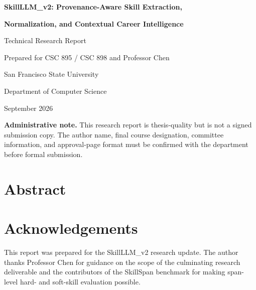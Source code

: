 \documentclass[12pt,letterpaper]{report}
\begin{document}
\begin{titlepage}
  \centering
  \vspace*{1.1in}
  {\Large\bfseries SkillLLM\_v2: Provenance-Aware Skill Extraction,\par}
  \vspace{0.12in}
  {\Large\bfseries Normalization, and Contextual Career Intelligence\par}
  \vspace{0.65in}
  {\large Technical Research Report\par}
  \vspace{0.24in}
  {\large Prepared for CSC 895 / CSC 898 and Professor Chen\par}
  \vfill
  {\large San Francisco State University\par}
  {\large Department of Computer Science\par}
  \vspace{0.35in}
  {\large September 2026\par}
  \vspace{0.35in}
  \begin{minipage}{0.84\textwidth}\small
  \textbf{Administrative note.} This research report is thesis-quality but is not a signed submission copy. The author name, final course designation, committee information, and approval-page format must be confirmed with the department before formal submission.
  \end{minipage}
\end{titlepage}

\chapter*{Abstract}


\chapter*{Acknowledgements}
This report was prepared for the SkillLLM\_v2 research update. The author thanks Professor Chen for guidance on the scope of the culminating research deliverable and the contributors of the SkillSpan benchmark for making span-level hard- and soft-skill evaluation possible.

\tableofcontents
\listoffigures
\listoftables
\end{document}
